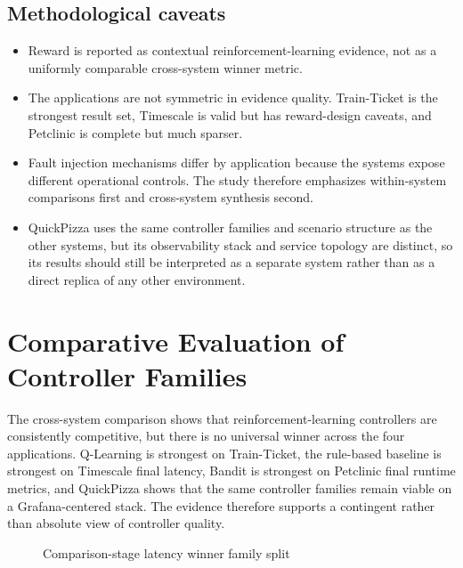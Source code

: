 \documentclass[10pt,twocolumn]{article}
\begin{document}
\subsection{Methodological caveats}
\begin{itemize}
  \item Reward is reported as contextual reinforcement-learning evidence, not as a uniformly comparable cross-system winner metric.
  \item The applications are not symmetric in evidence quality. Train-Ticket is the strongest result set, Timescale is valid but has reward-design caveats, and Petclinic is complete but much sparser.
  \item Fault injection mechanisms differ by application because the systems expose different operational controls. The study therefore emphasizes within-system comparisons first and cross-system synthesis second.
  \item QuickPizza uses the same controller families and scenario structure as the other systems, but its observability stack and service topology are distinct, so its results should still be interpreted as a separate system rather than as a direct replica of any other environment.
\end{itemize}

\section{Comparative Evaluation of Controller Families}
The cross-system comparison shows that reinforcement-learning controllers are consistently competitive, but there is no universal winner across the four applications. Q-Learning is strongest on Train-Ticket, the rule-based baseline is strongest on Timescale final latency, Bandit is strongest on Petclinic final runtime metrics, and QuickPizza shows that the same controller families remain viable on a Grafana-centered stack. The evidence therefore supports a contingent rather than absolute view of controller quality.


\begin{figure}[t]
\centering
{}
\caption{Comparison-stage latency winner family split}
\end{figure}
\end{document}
